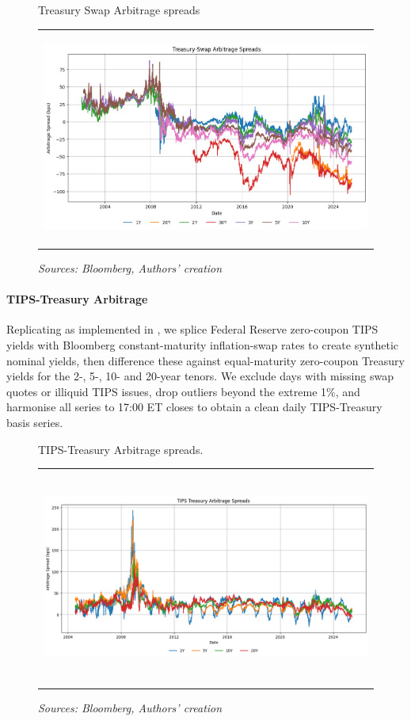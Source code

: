 \documentclass{article}
\begin{document}
\begin{figure}[h!]
  \centering
  \caption{Treasury Swap Arbitrage spreads}
  \begin{tabular}{@{}c@{}}
    \includegraphics[width=.7\linewidth,height=200pt,width=400pt]{../docs_src/treasury_swap_arbitrage_spreads.png}
  \end{tabular}
  \caption*{\emph{Sources: Bloomberg, Authors' creation}}
  \label{fig:treasury_swap_arbitrage}
\end{figure}


\paragraph{TIPS-Treasury Arbitrage}
Replicating \citet{Fleckenstein2014} as implemented in \citet{Siriwardane2021}, we splice Federal Reserve zero-coupon TIPS yields with Bloomberg constant-maturity inflation-swap rates to create synthetic nominal yields, then difference these against equal-maturity zero-coupon Treasury yields for the 2-, 5-, 10- and 20-year tenors.  We exclude days with missing swap quotes or illiquid TIPS issues, drop outliers beyond the extreme 1\%, and harmonise all series to 17:00 ET closes to obtain a clean daily TIPS-Treasury basis series.

\begin{figure}[h!]
    \caption{TIPS-Treasury Arbitrage spreads.}
  \centering
  \begin{tabular}{@{}c@{}}
    \includegraphics[width=.7\linewidth,height=200pt,width=400pt]{../docs_src/tips_treasury_arbitrage_spreads.png}
  \end{tabular}
  \caption*{\emph{Sources: Bloomberg, Authors' creation}}
  \label{fig:tips_treasury_basis}
\end{figure}
\end{document}
